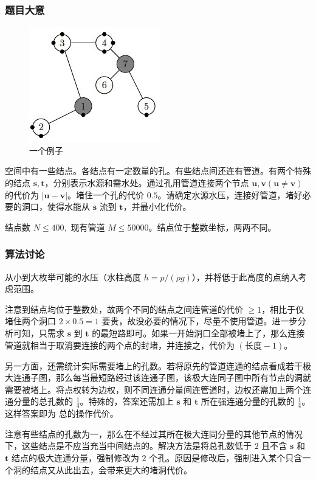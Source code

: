 			\subsubsection{题目大意}
				\begin{figure}
 					\centering\!\!\!\!\!\!
					\includegraphics[width=0.25 \textwidth]{3.jpg}
					\caption{一个例子}
				\end{figure}
				空间中有一些结点。各结点有一定数量的孔。有些结点间还连有管道。有两个特殊的结点 $\mathbf{s},\mathbf{t}$，分别表示水源和需水处。通过孔用管道连接两个节点 $\mathbf{u},\mathbf{v}(\mathbf{u} \ne  \mathbf{v}) $ 的代价为 $|\mathbf{u}-\mathbf{v}|$。堵住一个孔的代价 $0.5$。请确定水源水压，连接好管道，堵好必要的洞口，使得水能从 $\mathbf{s}$ 流到 $\mathbf{t}$，并最小化代价。
				
				结点数 $N \le 400, $ 现有管道 $M \le \num{50 000}$。结点位于整数坐标，两两不同。
			\subsubsection{算法讨论}
				从小到大枚举可能的水压（水柱高度 $h = p / ( \rho g)$），并将低于此高度的点纳入考虑范围。
				
				注意到结点均位于整数处，故两个不同的结点之间连管道的代价 $\ge 1$，相比于仅堵住两个洞口 $2 \times 0.5 = 1$ 要贵，故没必要的情况下，尽量不使用管道。进一步分析可知，只需求 $\mathbf{s}$ 到 $\mathbf{t}$ 的最短路即可。如果一开始洞口全部被堵上了，那么连接管道就相当于取消要连接的两个点的封堵，并连接之，代价为 $( \text{长度} -1)$。
				
				另一方面，还需统计实际需要堵上的孔数。若将原先的管道连通的结点看成若干极大连通子图，那么每当最短路经过该连通子图，该极大连同子图中所有节点的洞就需要被堵上。将点权转为边权，则不同连通分量间连管道时，边权还需加上两个连通分量的总孔数的 $\frac{1}{4}$。特殊的，答案还需加上 $\mathbf{s}$ 和 $\mathbf{t}$ 所在强连通分量的孔数的 $\frac{1}{4}$。 这样答案即为 总的操作代价。
				
				注意有些结点的孔数为一，那么在不经过其所在极大连同分量的其他节点的情况下，这些结点是不应当充当中间结点的。解决方法是将总孔数低于 $2$ 且不含  $\mathbf{s}$ 和 $\mathbf{t}$  结点的极大连通分量，强制修改为 $2$ 个孔。原因是修改后，强制进入某个只含一个洞的结点又从此出去，会带来更大的堵洞代价。
			
